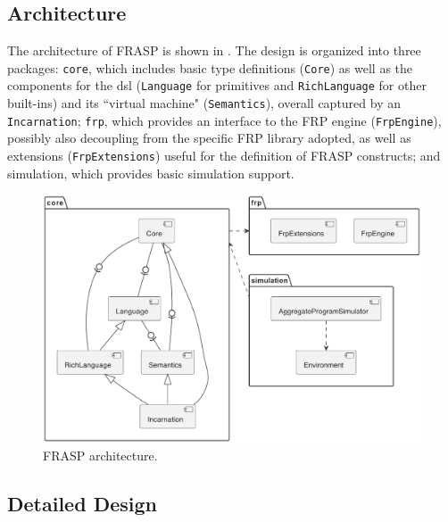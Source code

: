 \subsection{Architecture}

The architecture of FRASP is shown in . The design is organized into three packages: \texttt{core}, which includes basic type definitions (\texttt{Core}) as well as the components for the \ac{dsl} (\texttt{Language} for primitives and \texttt{RichLanguage} for other built-ins) and its ``virtual machine" (\texttt{Semantics}), overall captured by an \texttt{Incarnation}; \texttt{frp}, which provides an interface to the FRP engine (\texttt{FrpEngine}), possibly also decoupling from the specific FRP library adopted, as well as extensions (\texttt{FrpExtensions}) useful for the definition of FRASP constructs; and simulation, which provides basic simulation support.

\begin{figure}
    \centering
    \includegraphics[width=\linewidth]{figures/FRASP-architecture.png}
    \caption{FRASP architecture.}
    \label{fig:frasp-architecture}
\end{figure}

\subsection{Detailed Design}

